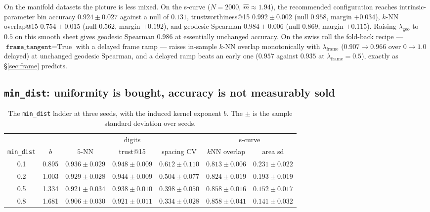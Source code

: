 \documentclass[12pt]{iopart}
\theoremstyle{definition}
\theoremstyle{plain}
\theoremstyle{remark}
\newcommand{\code}[1]{\texttt{#1}}
\begin{document}
On the manifold datasets the picture is less mixed. On the s-curve ($N=2000$,
$\hat m\approx1.94$), the recommended configuration reaches intrinsic-parameter
bin accuracy $0.924\pm0.027$ against a null of $0.131$, trustworthiness@15
$0.992\pm0.002$ (null $0.958$, margin $+0.034$), $k$-NN overlap@15
$0.754\pm0.015$ (null $0.562$, margin $+0.192$), and geodesic Spearman
$0.984\pm0.006$ (null $0.869$, margin $+0.115$). Raising
$\lambda_{\mathrm{geo}}$ to $0.5$ on this smooth sheet gives geodesic Spearman
$0.986$ at essentially unchanged accuracy. On the swiss roll the fold-back
recipe --- $\code{frame\_tangent}=\text{True}$ with a delayed frame ramp ---
raises in-sample $k$-NN overlap monotonically with $\lambda_{\mathrm{frame}}$
($0.907\to0.966$ over $0\to1.0$ delayed) at unchanged geodesic Spearman, and a
delayed ramp beats an early one ($0.957$ against $0.935$ at
$\lambda_{\mathrm{frame}}=0.5$), exactly as \S\ref{sec:frame} predicts.

\subsection{\texorpdfstring{\code{min\_dist}}{min\_dist}: uniformity is bought, accuracy is not measurably sold}
\label{sec:mindist}

\begin{table}[htbp]
\centering
\small
\caption{The \code{min\_dist} ladder at three seeds, with the induced kernel
exponent $b$. The $\pm$ is the sample standard deviation over seeds.}
\label{tab:mindist}
\begin{tabular}{cc|ccc|cc}
\toprule
& & \multicolumn{3}{c|}{digits} & \multicolumn{2}{c}{s-curve} \\
\code{min\_dist} & $b$ & $5$-NN & trust@15 & spacing CV & $k$NN overlap & area sd \\
\midrule
0.1 & 0.895 & $0.936\pm0.029$ & $0.948\pm0.009$ & $0.612\pm0.110$ & $0.813\pm0.006$ & $0.231\pm0.022$ \\
0.2 & 1.003 & $0.929\pm0.028$ & $0.944\pm0.009$ & $0.504\pm0.077$ & $0.824\pm0.019$ & $0.193\pm0.019$ \\
0.5 & 1.334 & $0.921\pm0.034$ & $0.938\pm0.010$ & $0.398\pm0.050$ & $0.858\pm0.016$ & $0.152\pm0.017$ \\
0.8 & 1.681 & $0.906\pm0.030$ & $0.921\pm0.011$ & $0.334\pm0.028$ & $0.858\pm0.041$ & $0.141\pm0.032$ \\
\bottomrule
\end{tabular}
\end{table}
\end{document}
